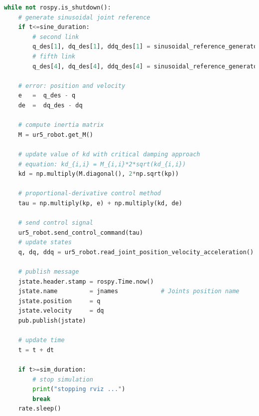 \begin{lstlisting}[language=Python,caption={Move the second and fifth joint of UR5 robot with the requirement motion of activity 1.5.2}, label={lst:joint_PD_control_critical_damping_sinusoidal}]
while not rospy.is_shutdown():
    # generate sinusoidal joint reference
    if t<=sine_duration:
        # second link
        q_des[1], dq_des[1], ddq_des[1] = sinusoidal_reference_generator(q0[1], dq0[1], ddq0[1], 0.2, 1, t)
        # fifth link
        q_des[4], dq_des[4], ddq_des[4] = sinusoidal_reference_generator(q0[4], dq0[4], ddq0[4], 0.4, 1.5, t) 

    # error: position and velocity
    e 	=  q_des - q
    de 	=  dq_des - dq    

    # compute inertia matrix
    M = ur5_robot.get_M()

    # update value of kd with critical damping approach
    # equation: kd_{i,i} = M_{i,i}*2*sqrt(kd_{i,i})
    kd = np.multiply(M.diagonal(), 2*np.sqrt(kp))

    # proportional-derivative control method
    tau = np.multiply(kp, e) + np.multiply(kd, de)
    
    # send control signal
    ur5_robot.send_control_command(tau)
    # update states
    q, dq, ddq = ur5_robot.read_joint_position_velocity_acceleration()

    # publish message
    jstate.header.stamp = rospy.Time.now()
    jstate.name 		= jnames			# Joints position name
    jstate.position 	= q
    jstate.velocity 	= dq
    pub.publish(jstate)

    # update time
    t = t + dt

    if t>=sim_duration:
        # stop simulation
        print("stopping rviz ...")
        break
    rate.sleep()
\end{lstlisting}


